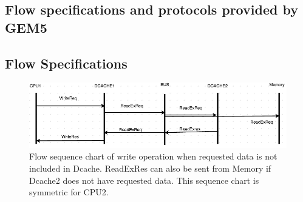 \documentclass[12pt,frontmatter,copyright,thesis]{usfmanus}
\begin{document}
\begin{appendix}
\appendix
\chapter{Flow specifications and protocols provided by GEM5}
\section{Flow Specifications}
\begin{figure}[h]
\centering
 \includegraphics[width=4.5In]{figures/write3.png}
 \caption{\footnotesize Flow sequence chart of write operation when requested data is not included in Dcache. ReadExRes can also be sent from Memory if Dcache2 does not have requested data. This sequence chart is symmetric for CPU2. }
 \label{write3}


\end{figure}
\end{appendix}
\end{document}
